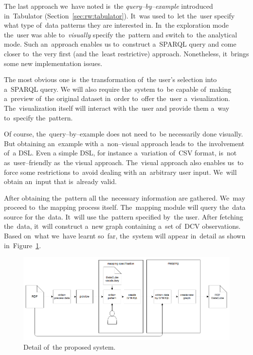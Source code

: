 The last approach we~have noted is~the \emph{query--by--example} introduced in~Tabulator (Section~\ref{sec:rw:tabulator}). It~was used to~let the~user specify what type of~data patterns they are 
interested in. In~the exploration mode the~user was able to~\emph{visually} 
specify the~pattern and switch to~the analytical mode. Such an~approach enables 
us to~construct a~SPARQL query and come closer to~the very first (and the~least restrictive) 
approach. Nonetheless, it~brings some new implementation issues.

The most obvious one is~the transformation of~the user's selection into a~SPARQL query. 
We will also require the~system to~be capable of~making a~preview of~the 
original dataset in~order to~offer the~user a~visualization. The~visualization 
itself will interact with the~user and provide them a~way to~specify the~pattern.

Of course, the~query--by--example does not need to~be necessarily done visually. But 
obtaining an~example with a~non--visual approach leads to~the involvement of~a DSL. Even 
a simple DSL, for instance a~variation of~CSV format, is~not as~user--friendly as~the visual approach. The~visual approach also enables us~to force some 
restrictions to~avoid dealing with an~arbitrary user input. We~will 
obtain an~input that is~already valid.

After obtaining the~pattern all the~necessary information are gathered. We~may proceed to~the mapping process itself. The~mapping module will query the~data source for the~data. It~will use the~pattern specified by~the user. After 
fetching the~data, it~will construct a~new graph containing a~set of~DCV 
observations. Based on~what we~have learnt so~far, the~system will appear in~detail 
as shown in~Figure~\ref{fig:generic-mapping-detail}.

\begin{figure}
	\centering
	\includegraphics[width=140mm]{img/generic-mapping-detail.png}
	\caption{Detail of~the proposed system.}
	\label{fig:generic-mapping-detail}
\end{figure}


